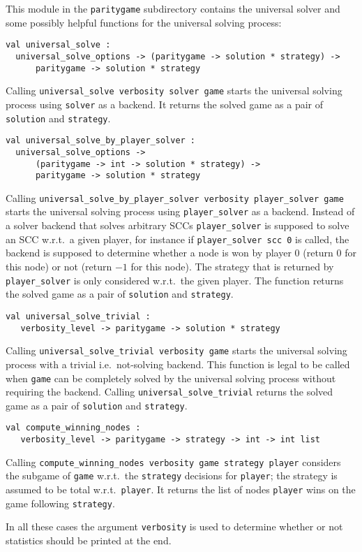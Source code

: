 This module in the \texttt{paritygame} subdirectory contains the universal solver and some possibly helpful functions
for the universal solving process:
\begin{description}
\itemsep3mm

\item
\begin{verbatim}
val universal_solve :
  universal_solve_options -> (paritygame -> solution * strategy) ->
      paritygame -> solution * strategy
\end{verbatim}
Calling \verb+universal_solve verbosity solver game+ starts the universal solving process using \verb+solver+ as a
backend. It returns the solved game as a pair of \verb+solution+ and \verb+strategy+.

\item
\begin{verbatim}
val universal_solve_by_player_solver :
  universal_solve_options ->
      (paritygame -> int -> solution * strategy) ->
      paritygame -> solution * strategy
\end{verbatim}
Calling \verb+universal_solve_by_player_solver verbosity player_solver game+ \linebreak starts the universal
solving process using \verb+player_solver+ as a backend. Instead of a solver backend that solves arbitrary SCCs
\verb+player_solver+ is supposed to solve an SCC w.r.t.\ a given player, for instance if \verb+player_solver scc 0+
is called, the backend is supposed to determine whether a node is won by player $0$ (return $0$ for this node) or
not (return $-1$ for this node). The strategy that is returned by \verb+player_solver+ is only considered w.r.t.\
the given player. The function returns the solved game as a pair of \verb+solution+ and \verb+strategy+.

\item
\begin{verbatim}
val universal_solve_trivial :
   verbosity_level -> paritygame -> solution * strategy
\end{verbatim}
Calling \verb+universal_solve_trivial verbosity game+ starts the universal solving process with a trivial i.e.\
not-solving backend. This function is legal to be called when \verb+game+ can be completely solved by the universal
solving process without requiring the backend. Calling \verb+universal_solve_trivial+ returns the solved game as a
pair of \verb+solution+ and \verb+strategy+.

\item
\begin{verbatim}
val compute_winning_nodes :
   verbosity_level -> paritygame -> strategy -> int -> int list
\end{verbatim}
Calling \verb+compute_winning_nodes verbosity game strategy player+ considers \linebreak the subgame of \verb+game+ w.r.t.\
the \verb+strategy+ decisions for \verb+player+; the strategy is assumed to be total w.r.t.\ \verb+player+. It
returns the list of nodes \verb+player+ wins on the game following \verb+strategy+.
\end{description}
In all these cases the argument \verb+verbosity+ is used to determine whether or not statistics should be printed
at the end.


